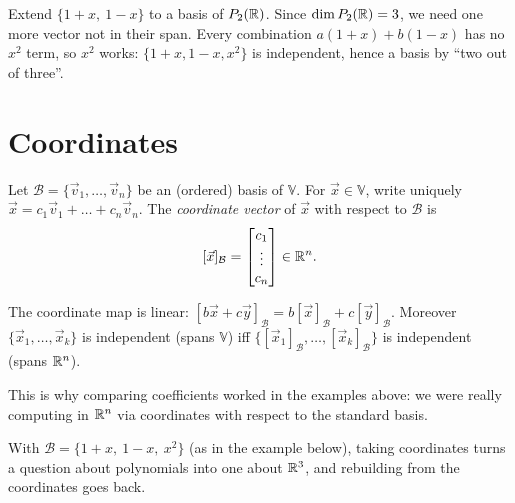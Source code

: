 \begin{example}
Extend $\{1+x,\ 1-x\}$ to a basis of $P_{2}(\mathbb{R})$. Since $\dim P_{2}(\mathbb{R})=3$, we need one more vector not in their
span. Every combination $a(1+x)+b(1-x)$ has no $x^2$ term, so $x^2$ works: $\{1+x,1-x,x^2\}$ is independent, hence a
basis by ``two out of three''.
\end{example}

\section{Coordinates}

\begin{definition}
Let $\mathcal B=\{\vec v_1,\dots,\vec v_n\}$ be an (ordered) basis of $\mathbb V$. For $\vec x\in\mathbb V$, write
uniquely $\vec x=c_1\vec v_1+\dots+c_n\vec v_n$. The \emph{coordinate vector} of $\vec x$ with respect to $\mathcal B$ is
\[
  [\vec x]_{\mathcal B}=\begin{bmatrix}c_1\\\vdots\\c_n\end{bmatrix}\in\mathbb{R}^n .
\]
\end{definition}

\begin{theorem}
The coordinate map is linear: $[b\vec x+c\vec y]_{\mathcal B}=b[\vec x]_{\mathcal B}+c[\vec y]_{\mathcal B}$. Moreover
$\{\vec x_1,\dots,\vec x_k\}$ is independent (spans $\mathbb V$) iff $\{[\vec x_1]_{\mathcal B},\dots,[\vec x_k]_{\mathcal B}\}$ is
independent (spans $\mathbb{R}^n$).
\end{theorem}

This is why comparing coefficients worked in the examples above: we were really computing in $\mathbb{R}^n$ via
coordinates with respect to the standard basis.

\begin{center}
\end{center}
With $\mathcal B = \{1+x,\ 1-x,\ x^2\}$ (as in the example below), taking coordinates turns a question
about polynomials into one about $\mathbb{R}^3$, and rebuilding from the coordinates goes back.

